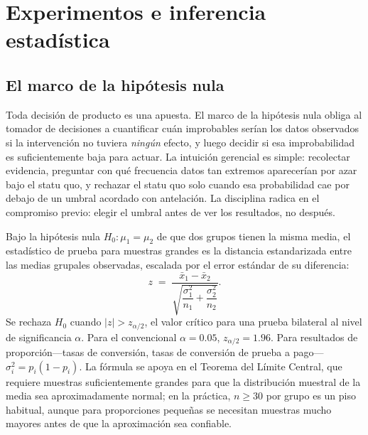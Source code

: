 \chapter{Experimentos e inferencia estadística}\label{ch:experiments-and-inference}


\section{El marco de la hipótesis nula}\label{sec:null-hypothesis}

Toda decisión de producto es una apuesta. El marco de la hipótesis nula obliga al tomador de
decisiones a cuantificar cuán improbables serían los datos observados si la intervención no
tuviera \emph{ningún} efecto, y luego decidir si esa improbabilidad es suficientemente baja
para actuar. La intuición gerencial es simple: recolectar evidencia, preguntar con qué
frecuencia datos tan extremos aparecerían por azar bajo el statu quo, y rechazar el statu
quo solo cuando esa probabilidad cae por debajo de un umbral acordado con antelación. La
disciplina radica en el compromiso previo: elegir el umbral antes de ver los resultados, no
después.

Bajo la hipótesis nula \(H_0: \mu_1 = \mu_2\) de que dos grupos tienen la misma media, el
estadístico de prueba para muestras grandes es la distancia estandarizada entre las medias
grupales observadas, escalada por el error estándar de su diferencia:
\begin{equation}\label{eq:z-test}
  z \;=\; \frac{\bar{x}_1 - \bar{x}_2}%
               {\sqrt{\dfrac{\sigma_1^2}{n_1}+\dfrac{\sigma_2^2}{n_2}}}.
\end{equation}
Se rechaza \(H_0\) cuando \(|z| > z_{\alpha/2}\), el valor crítico para una prueba bilateral
al nivel de significancia \(\alpha\). Para el convencional \(\alpha=0.05\), \(z_{\alpha/2}=1.96\).
Para resultados de proporción---tasas de conversión, tasas de conversión de prueba a pago---\(\sigma_i^2 = p_i(1-p_i)\).
La fórmula se apoya en el Teorema del Límite Central, que requiere muestras suficientemente
grandes para que la distribución muestral de la media sea aproximadamente normal; en la
práctica, \(n \geq 30\) por grupo es un piso habitual, aunque para proporciones pequeñas se
necesitan muestras mucho mayores antes de que la aproximación sea confiable.

